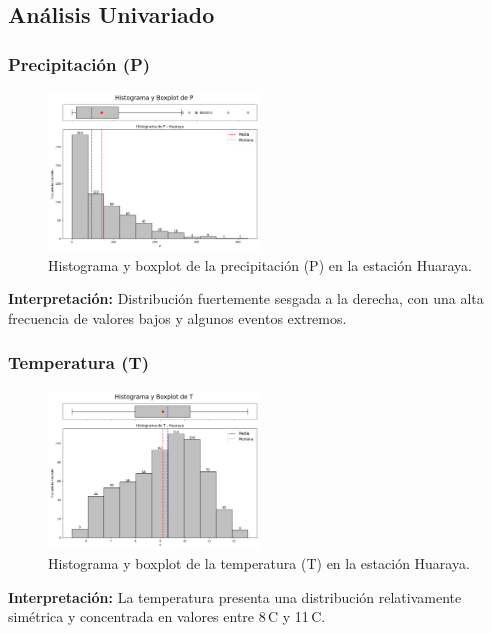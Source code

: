 \subsection{Análisis Univariado}

\subsubsection*{Precipitación (P)}
\begin{figure}[H]
\centering
\includegraphics[width=0.5\textwidth]{resultados/por_estacion_meteorologica/Huaraya/P_histograma.png}
\caption{Histograma y boxplot de la precipitación (P) en la estación Huaraya.}
\label{fig:huaraya_P}
\end{figure}
\textbf{Interpretación:} Distribución fuertemente sesgada a la derecha, con una alta frecuencia de valores bajos y algunos eventos extremos.

\subsubsection*{Temperatura (T)}
\begin{figure}[H]
\centering
\includegraphics[width=0.5\textwidth]{resultados/por_estacion_meteorologica/Huaraya/T_histograma.png}
\caption{Histograma y boxplot de la temperatura (T) en la estación Huaraya.}
\label{fig:huaraya_T}
\end{figure}
\textbf{Interpretación:} La temperatura presenta una distribución relativamente simétrica y concentrada en valores entre 8\,\textdegree C y 11\,\textdegree C.

